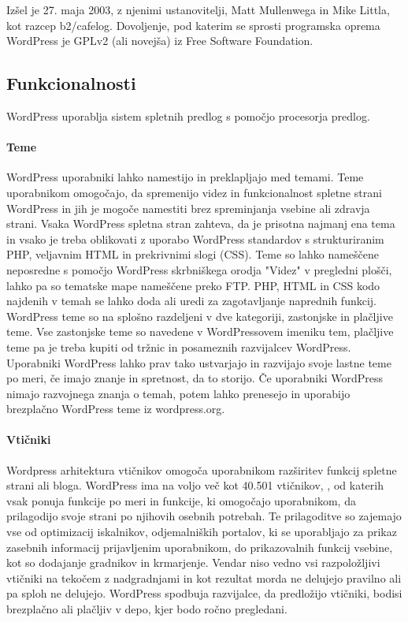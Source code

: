 \documentclass[a4paper, 12pt]{book}
\begin{document}
Izšel je 27. maja 2003, z njenimi ustanovitelji, Matt Mullenwega \cite{87} in Mike Littla, \cite{88} kot razcep b2/cafelog. Dovoljenje, pod katerim se sprosti programska oprema WordPress je GPLv2 (ali novejša) iz Free Software Foundation. \cite{89} 

\subsection{Funkcionalnosti}
WordPress uporablja sistem spletnih predlog s pomočjo procesorja predlog.

\paragraph{Teme}
WordPress uporabniki lahko namestijo in preklapljajo med temami. Teme uporabnikom omogočajo, da spremenijo videz in funkcionalnost spletne strani WordPress in jih je mogoče namestiti brez spreminjanja vsebine ali zdravja strani. Vsaka WordPress spletna stran zahteva, da je prisotna najmanj ena tema in vsako je treba oblikovati z uporabo WordPress standardov s strukturiranim PHP, veljavnim HTML in prekrivnimi slogi (CSS). Teme so lahko nameščene neposredne s pomočjo WordPress  skrbniškega orodja "Videz" v pregledni plošči, lahko pa so tematske mape nameščene preko FTP. \cite{90} PHP, HTML in CSS kodo najdenih v temah se lahko doda ali uredi za zagotavljanje naprednih funkcij. WordPress teme so na splošno razdeljeni v dve kategoriji, zastonjske in plačljive teme. Vse zastonjske teme so navedene v WordPressovem imeniku tem, plačljive teme pa je treba kupiti od tržnic in posameznih razvijalcev WordPress. Uporabniki WordPress lahko prav tako ustvarjajo in razvijajo svoje lastne teme po meri, če imajo znanje in spretnost, da to storijo. Če uporabniki WordPress nimajo razvojnega znanja o temah, potem lahko prenesejo in uporabijo brezplačno WordPress teme iz wordpress.org. 

\paragraph{Vtičniki}
Wordpress arhitektura vtičnikov omogoča uporabnikom razširitev funkcij spletne strani ali bloga. WordPress ima na voljo več kot 40.501  vtičnikov, \cite{91}, od katerih vsak ponuja funkcije po meri in funkcije, ki omogočajo uporabnikom, da prilagodijo svoje strani po njihovih osebnih potrebah. Te prilagoditve so zajemajo vse od optimizacij iskalnikov, odjemalniških portalov, ki se uporabljajo za prikaz zasebnih informacij prijavljenim uporabnikom, do prikazovalnih funkcij vsebine, kot so dodajanje gradnikov in krmarjenje. Vendar niso vedno vsi razpoložljivi vtičniki  na tekočem z nadgradnjami in kot rezultat morda ne delujejo pravilno ali pa sploh ne delujejo. \cite{92} WordPress spodbuja razvijalce, da predložijo vtičniki, bodisi brezplačno ali plačljiv v depo, kjer bodo ročno pregledani. \cite{93}
\end{document}
